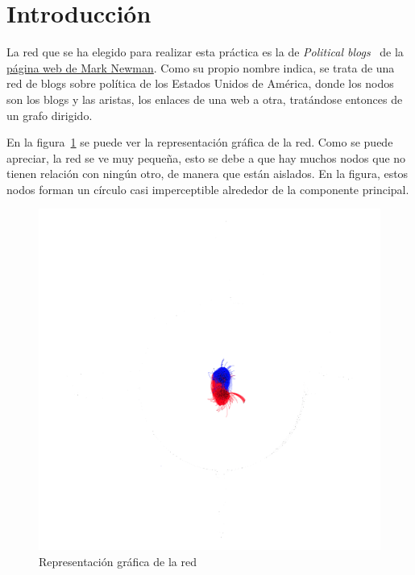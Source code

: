 \section{Introducción}

La red que se ha elegido para realizar esta práctica es la de \textit{Political
blogs}~\cite{data} de la
\href{http://www-personal.umich.edu/~mejn/netdata/}{página web de
Mark Newman}. Como su propio nombre indica, se trata de una red de blogs sobre
política de los Estados Unidos de América, donde los nodos son los blogs y las
aristas, los enlaces de una web a otra, tratándose entonces de un grafo
dirigido.

En la figura~\ref{fig:network-parties} se puede ver la representación gráfica de
la red. Como se puede apreciar, la red se ve muy pequeña, esto se debe a que hay
muchos nodos que no tienen relación con ningún otro, de manera que están
aislados. En la figura, estos nodos forman un círculo casi imperceptible
alrededor de la componente principal.

\begin{figure}[h!]
    \includegraphics[height=\textwidth]{images/network/parties.png}
    \caption{Representación gráfica de la red}
    \label{fig:network-parties}
\end{figure}

\newpage

